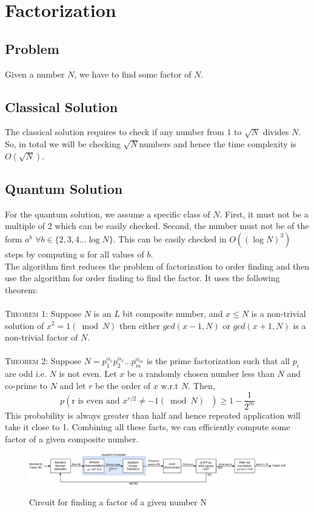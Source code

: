 \section{Factorization}
\subsection{Problem}
Given a number $N$, we have to find some factor of $N$.
\subsection{Classical Solution}
The classical solution requires to check if any number from $1$ to $\sqrt{N}$ divides $N$. So, in total we will be checking $\sqrt{N}
$numbers and hence the time complexity is $O(\sqrt{N})$.
\subsection{Quantum Solution}
For the quantum solution, we assume a specific class of $N$. First, it must not be a multiple of 2 which can be easily checked. Second, the number must not be of the form $a^b$ $\forall b\in \{2,3,4...\log N\}$. This can be easily checked in $O((\log N)^3)$ steps by computing $a$ for all values of $b$.\\
The algorithm first reduces the problem of factorization to order finding and then use the algorithm for order finding to find the factor. It uses the following theorem:\\
\\{\scshape Theorem 1: } Suppose $N$ is an $L$ bit composite number, and $x \leq N$ is a non-trivial solution of $x^2 = 1(\bmod N) $ then either $gcd(x-1,N)$ or $gcd(x+1,N)$ is a non-trivial factor of $N$.\\
\\{\scshape Theorem 2: } Suppose $N = p_1^{\alpha_1}p_2^{\alpha_2}...p_m^{\alpha_m}$ is the prime factorization such that all $p_i$ are odd i.e. $N$ is not even. Let $x$ be a randomly chosen number less than $N$ and co-prime to $N$ and let $r$ be the order of $x$ w.r.t $N$. Then, 
\begin{equation}
p(\text{r is even and $x^{r/2} \ne -1 (\bmod N)$ }) \geq  1- \frac{1}{2^m}
\end{equation}This probability is always greater than half and hence repeated application will take it close to 1. Combining all these facts, we can efficiently compute some factor of a given composite number.\\
\begin{figure}[h]
\centering
\includegraphics[width=1\textwidth]{images/factor.png}
\label{factor}
\caption{Circuit for finding a factor of a given number N}
\end{figure}

